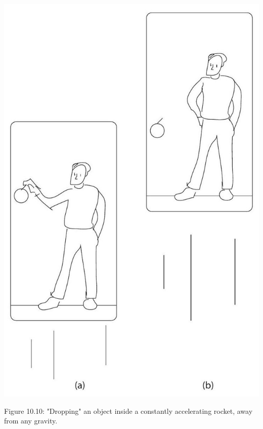\documentclass[10pt]{article}
\begin{document}
\begin{center}
\includegraphics[max width=\textwidth]{2024_09_14_9969b06773f10b6936e8g-257}
\end{center}

Figure 10.10: "Dropping" an object inside a constantly accelerating rocket, away from any gravity.
\end{document}

